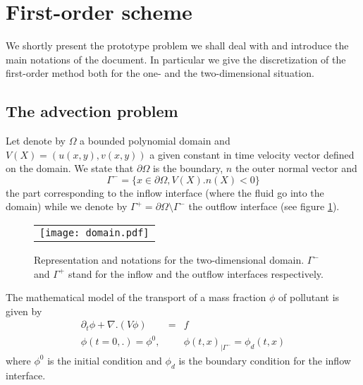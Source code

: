\section{First-order scheme}
\label{sec:200}
We shortly present the prototype problem we shall deal with and introduce the main notations of the document.
In particular we give the discretization of the first-order method both for the one- and the two-dimensional
situation.
\subsection{The advection problem}
Let denote by $\Omega$ a bounded polynomial domain and $V(X)=(u(x,y),v(x,y))$ a given constant in time
velocity vector defined on the domain. 
We state that $\partial \Omega$ is the boundary, $n$ the outer normal vector and 
$$
\Gamma^-=\{x\in\partial \Omega, V(X).n(X)<0 \}
$$ 
the part corresponding to the inflow interface (where the fluid go into the domain)
while we denote by $\Gamma^+=\partial \Omega \setminus \Gamma^-$ the outflow interface (see figure \ref{domain}).
\begin{figure}[ht]
\begin{center}
\begin{tabular}{c}
\texttt{[image: domain.pdf]}
\end{tabular}
\end{center}
\caption{\label{domain} \footnotesize Representation and notations for the two-dimensional domain.
$\Gamma^-$ and $\Gamma^+$ stand for the inflow and the outflow interfaces respectively.}
\end{figure}



The mathematical
model of the transport of a mass fraction $\phi$ of pollutant is given by
\begin{eqnarray}
\partial_t \phi+\nabla.(V\phi)&=&f\\
\phi(t=0,.)=\phi^0, & & \phi(t,x)_{|\Gamma^-}=\phi_d(t,x)
\end{eqnarray}
where $\phi^0$ is the initial condition and $\phi_d$ is the boundary condition for the inflow interface.
